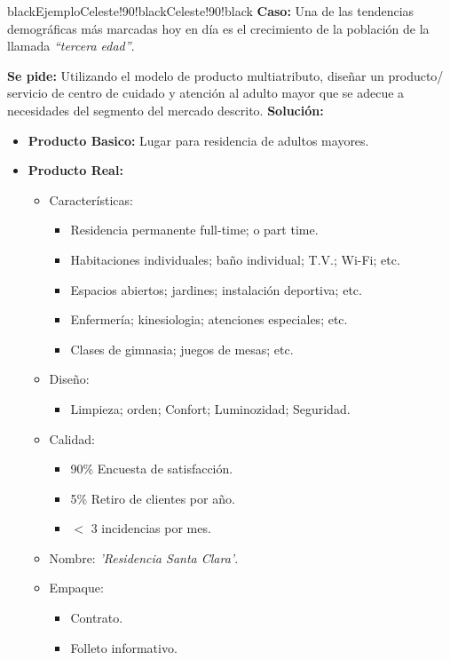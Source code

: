 \documentclass{templateNote}
\newcommand{\comillas}[1]{``#1''}
\begin{document}
\begin{CuadroPersonalizado}{black}{Ejemplo}{Celeste!90!black}{Celeste!90!black}
  \textbf{Caso:} Una de las tendencias demográficas más marcadas hoy en día es el crecimiento de la población de la llamada \textit{\comillas{tercera edad}}. 

  \textbf{Se pide:} Utilizando el modelo de producto multiatributo, diseñar un producto/ servicio de centro de cuidado y atención al adulto mayor que se adecue a necesidades del segmento del mercado descrito.
  \newline
  \textbf{Solución:}
  \begin{itemize}
    \item \textbf{Producto Basico:} Lugar para residencia de adultos mayores.
    \item \textbf{Producto Real:}
    \begin{itemize}
      \item Características:
      \begin{itemize}
        \item Residencia permanente full-time; o part time.
        \item Habitaciones individuales; baño individual; T.V.; Wi-Fi; etc.
        \item Espacios abiertos; jardines; instalación deportiva; etc.
        \item Enfermería; kinesiologia; atenciones especiales; etc.
        \item Clases de gimnasia; juegos de mesas; etc.
      \end{itemize}
      \item Diseño:
      \begin{itemize}
        \item Limpieza; orden; Confort; Luminozidad; Seguridad.
      \end{itemize}
      \item Calidad:
      \begin{itemize}
        \item 90\% Encuesta de satisfacción.
        \item 5\% Retiro de clientes por año.
        \item $ < $ 3 incidencias por mes.
      \end{itemize}
      \item Nombre: \textit{'Residencia Santa Clara'}.
      \item Empaque:
      \begin{itemize}
        \item Contrato.
        \item Folleto informativo.
      \end{itemize}
    \end{itemize}
  \end{itemize}
\end{CuadroPersonalizado}
\newpage
\end{document}
